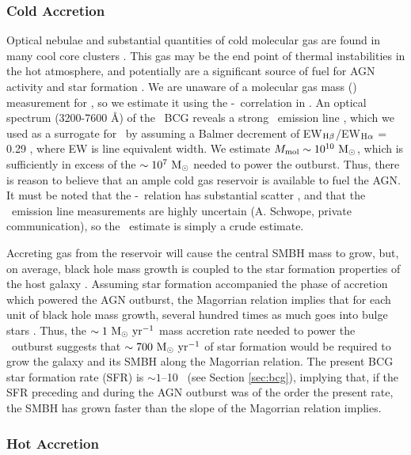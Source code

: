 \documentclass[iop]{emulateapj}
\begin{document}
\subsubsection{Cold Accretion}
\label{sec:cold}

Optical nebulae and substantial quantities of cold molecular gas are
found in many cool core clusters \citep{crawford99, edge01}. This gas
may be the end point of thermal instabilities in the hot atmosphere,
and potentially are a significant source of fuel for AGN activity and
star formation \citep[\eg][]{pizzolato05, 2006NewA...12...38S,
  2010MNRAS.408..961P}. We are unaware of a molecular gas mass (\mmol)
measurement for \rbs, so we estimate it using the
\mmol-\halpha\ correlation in \citet{edge01}. An optical spectrum
(3200-7600 \AA) of the \rbs\ BCG reveals a strong \hbeta\ emission
line \citep{rbs1, rbs2}, which we used as a surrogate for \halpha\ by
assuming a Balmer decrement of EW$_{\rm{H}\beta}$/EW$_{\rm{H}\alpha}$ = 0.29
\citep{2006ApJ...642..775M}, where EW is line equivalent width. We
estimate $M_{\rm{mol}} \sim 10^{10} ~\rm{M_{\odot}}$, which is sufficiently in excess
of the $\sim 10^7 ~\rm{M_{\odot}}$ needed to power the outburst. Thus, there is
reason to believe that an ample cold gas reservoir is available to
fuel the AGN. It must be noted that the \mmol-\halpha\ relation has
substantial scatter \citep{salome03}, and that the \rbs\ emission line
measurements are highly uncertain (A. Schwope, private communication),
so the \mmol\ estimate is simply a crude estimate.

Accreting gas from the reservoir will cause the central SMBH mass to
grow, but, on average, black hole mass growth is coupled to the star
formation properties of the host galaxy
\citep[\eg][]{1995ARA&A..33..581K, 2000ApJ...539L...9F}. Assuming star
formation accompanied the phase of accretion which powered the AGN
outburst, the Magorrian relation \citep{magorrian} implies that for
each unit of black hole mass growth, several hundred times as much
goes into bulge stars \citep[\eg][]{2004ApJ...604L..89H}. Thus, the
$\sim 1 ~\mbox{\ensuremath{\rm{M_{\odot}}~\rm{\mbox{\ensuremath{\rm{yr}}}^{-1}}}}$ mass accretion rate needed to power the
\rbs\ outburst suggests that $\sim 700 ~\mbox{\ensuremath{\rm{M_{\odot}}~\rm{\mbox{\ensuremath{\rm{yr}}}^{-1}}}}$ of star formation
would be required to grow the galaxy and its SMBH along the Magorrian
relation. The present BCG star formation rate (SFR) is $\sim 1$--10
\msolpy\ (see Section \ref{sec:bcg}), implying that, if the SFR
preceding and during the AGN outburst was of the order the present
rate, the SMBH has grown faster than the slope of the Magorrian
relation implies.

\subsubsection{Hot Accretion}
\end{document}
